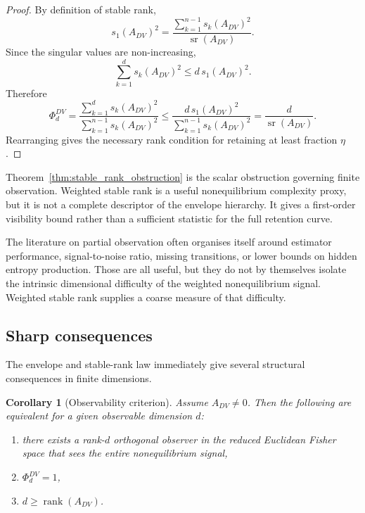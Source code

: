 \documentclass[11pt,a4paper]{article}
\numberwithin{equation}{section}
\theoremstyle{thmcompact}
\newtheorem{corollary}[theorem]{Corollary}
\theoremstyle{remark}
\begin{document}
\begin{proof}
By definition of stable rank,
\begin{equation}
s_1(A_{DV})^2
=
\frac{\sum_{k=1}^{n-1}s_k(A_{DV})^2}{\operatorname{sr}(A_{DV})}.
\end{equation}
Since the singular values are non-increasing,
\begin{equation}
\sum_{k=1}^{d}s_k(A_{DV})^2\le d\,s_1(A_{DV})^2.
\end{equation}
Therefore
\begin{equation}
\Phi_d^{DV}
=
\frac{\sum_{k=1}^{d}s_k(A_{DV})^2}{\sum_{k=1}^{n-1}s_k(A_{DV})^2}
\le
\frac{d\,s_1(A_{DV})^2}{\sum_{k=1}^{n-1}s_k(A_{DV})^2}
=
\frac{d}{\operatorname{sr}(A_{DV})}.
\end{equation}
Rearranging gives the necessary rank condition for retaining at least fraction \(\eta\).
\end{proof}

Theorem~\ref{thm:stable_rank_obstruction} is the scalar obstruction governing finite observation. Weighted stable rank is a useful nonequilibrium complexity proxy, but it is not a complete descriptor of the envelope hierarchy. It gives a first-order visibility bound rather than a sufficient statistic for the full retention curve.

The literature on partial observation often organises itself around estimator performance, signal-to-noise ratio, missing transitions, or lower bounds on hidden entropy production. Those are all useful, but they do not by themselves isolate the intrinsic dimensional difficulty of the weighted nonequilibrium signal. Weighted stable rank supplies a coarse measure of that difficulty.

\subsection{Sharp consequences}

The envelope and stable-rank law immediately give several structural consequences in finite dimensions.

\begin{corollary}[Observability criterion]
\label{cor:exact_observability_criterion}
Assume \(A_{DV}\neq 0\). Then the following are equivalent for a given observable dimension \(d\):
\begin{enumerate}
\item there exists a rank-\(d\) orthogonal observer in the reduced Euclidean Fisher space that sees the entire nonequilibrium signal,
\item \(\Phi_d^{DV}=1\),
\item \(d\ge \operatorname{rank}(A_{DV})\).
\end{enumerate}
\end{corollary}
\end{document}
